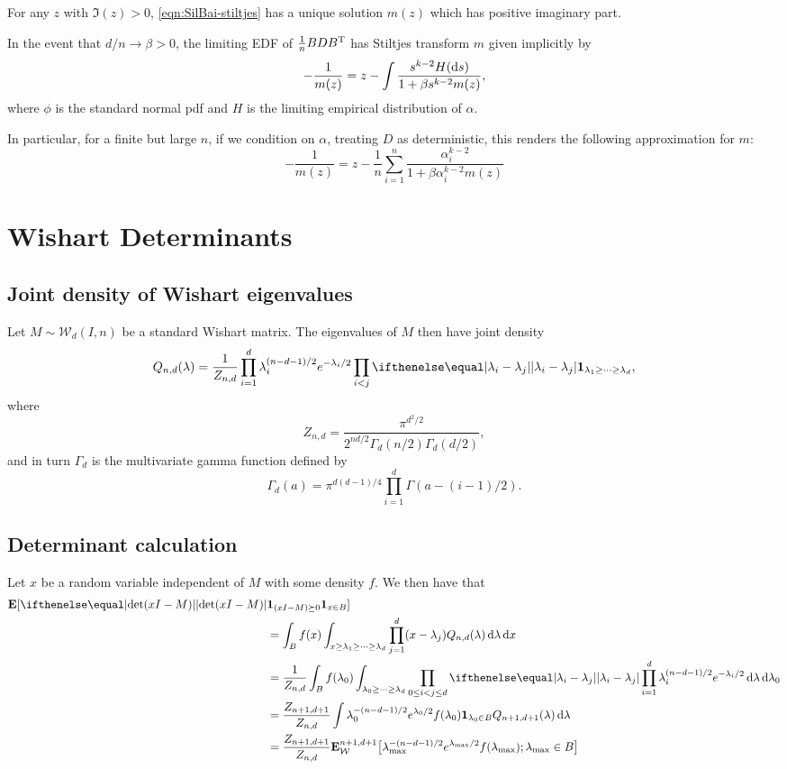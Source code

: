 \documentclass{hw-scrartcl}
\begin{document}
\begin{theorem}
  For any \(z\) with \(\Im(z) > 0\), \cref{eqn:SilBai-stiltjes} has a unique solution \(m(z)\) which has positive imaginary part.
\end{theorem}

In the event that \(d/n \rightarrow \beta > 0\), the limiting EDF of \(\frac{1}{n} BDB^{\mathrm{T}}\) has Stiltjes transform \(m\) given implicitly by
\[
  -\frac{1}{m(z)}
  = z - \int \frac{s^{k-2}H(\mathop{}\!\mathrm{d} s)}{1 + \beta s^{k-2} m(z)},
\]
where \(\phi\) is the standard normal pdf and \(H\) is the limiting empirical distribution of \(\alpha\).

In particular, for a finite but large \(n\), if we condition on \(\alpha\), treating \(D\) as deterministic, this renders the following approximation for \(m\):
\[
  -\frac{1}{m(z)}
  = z - \frac{1}{n}\sum_{i=1}^n \frac{\alpha_i^{k-2}}{1 + \beta \alpha_i^{k-2} m(z)}
\]


\section{Wishart Determinants}
\subsection{Joint density of Wishart eigenvalues}
Let \(M \sim \mathcal{W}_d(I, n)\) be a standard Wishart matrix. The eigenvalues of \(M\) then have joint density
\[
  Q_{n, d}(\lambda)
  = \frac{1}{Z_{n, d}} \prod_{i=1}^d \lambda_i^{(n-d-1)/2} e^{-\lambda_i/2} \prod_{i < j} \abs{\lambda_i - \lambda_j} \ind_{\lambda_1 \geq \dotsb \geq \lambda_d},
\]
where
\[
  Z_{n, d}
  = \frac{\pi^{d^2/2}}{2^{nd/2} \Gamma_d(n/2) \Gamma_d(d/2)},
\]
and in turn \(\Gamma_d\) is the multivariate gamma function defined by
\[
  \Gamma_d(a)
  = \pi^{d(d-1)/4} \prod_{i=1}^d \Gamma(a - (i-1)/2).
\]

\subsection{Determinant calculation}
Let \(x\) be a random variable independent of \(M\) with some density \(f\). We then have that
\begin{align*}
  \E[\abs{\det(xI - M)}
  &\ind_{(xI - M) \succeq 0} \ind_{x \in B}] \\
  &= \int_B f(x) \int_{x \geq \lambda_1 \geq \dotsb \geq \lambda_d} \prod_{j=1}^d (x - \lambda_j) Q_{n, d}(\lambda) \diff \lambda \diff x \\
  &= \frac{1}{Z_{n, d}} \int_B f(\lambda_{0}) \int_{\lambda_0 \geq \dotsb \geq \lambda_d} \prod_{0\leq i < j \leq d} \abs{\lambda_i - \lambda_j} \prod_{i=1}^d \lambda_i ^{(n-d-1)/2} e^{-\lambda_i/2} \diff \lambda \diff \lambda_0 \\
  &= \frac{Z_{n+1, d+1}}{Z_{n, d}} \int \lambda_0^{-(n-d-1)/2} e^{\lambda_0/2} f(\lambda_0)\ind_{\lambda_0 \in B} Q_{n+1, d+1}(\lambda) \diff \lambda \\
  &= \frac{Z_{n+1, d+1}}{Z_{n, d}} \E_{\mathcal{W}}^{n+1, d+1}\big[\lambda_{\max}^{-(n-d-1)/2} e^{\lambda_{\max}/2} f(\lambda_{\max}) ; \lambda_{\max} \in B\big]
\end{align*}
\end{document}
